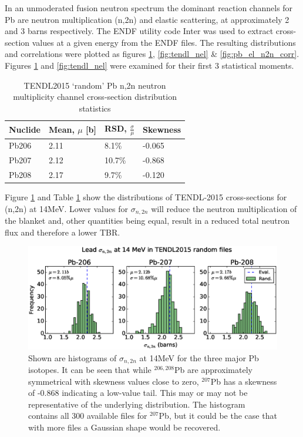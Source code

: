 In an unmoderated fusion neutron spectrum the dominant reaction channels for Pb are neutron multiplication (n,2n) and elastic scattering, at approximately 2 and 3 barns respectively. The ENDF utility code Inter was used to extract cross-section values at a given energy from the ENDF files. The resulting distributions and correlations were plotted as figures \ref{fig:tendl_n2n}, \ref{fig:tendl_nel} \& \ref{fig:pb_el_n2n_corr}. Figures \ref{fig:tendl_n2n} and \ref{fig:tendl_nel} were examined for their first 3 statistical moments. 

\begin{table}[ht]
  \footnotesize
  \centering 
  \begin{tabular}{llll}
    \toprule
    Nuclide & Mean, $\mu$ [b] & RSD, $\frac{\sigma}{\mu}$ & Skewness \\
    \midrule
    Pb206 & 2.11 & 8.1\% & -0.065 \\
    Pb207 & 2.12 & 10.7\% & -0.868 \\
    Pb208 & 2.17 & 9.7\% & -0.120 \\
    \bottomrule
  \end{tabular}
  \caption{TENDL2015 `random' Pb n,2n neutron multiplicity channel cross-section distribution statistics}
  \label{table:n2n} %
\end{table}

Figure \ref{fig:tendl_n2n} and Table \ref{table:n2n} show the distributions of TENDL-2015 cross-sections for (n,2n) at 14MeV. Lower values for $\sigma_{n,2n}$ will reduce the neutron multiplication of the blanket and, other quantities being equal, result in a reduced total neutron flux and therefore a lower TBR.

\begin{figure}[ht]
	\includegraphics[width=\textwidth]{pb_tendl_n2n_hist}
	\caption{Shown are histograms of $\sigma_{n,2n}$ at 14MeV for the three major Pb isotopes. It can be seen that while $^{206,208}$Pb are approximately symmetrical with skewness values close to zero, $^{207}$Pb has a skewness of -0.868 indicating a low-value tail. This may or may not be representative of the underlying distribution. The histogram contains all 300 available files for $^{207}$Pb, but it could be the case that with more files a Gaussian shape would be recovered.}
	\label{fig:tendl_n2n}
\end{figure}

